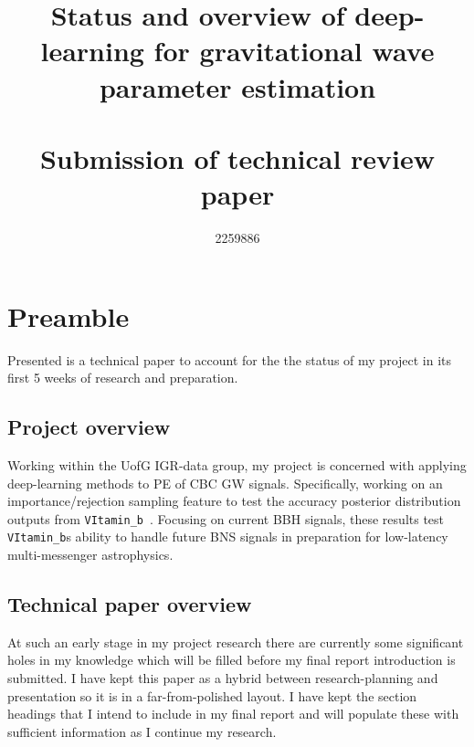 \documentclass[11pt]{article}
\title{\bf{Status and overview of deep-learning for gravitational wave parameter estimation}\\~\\
\large Submission of technical review paper}
\author{2259886}
\begin{document}
\maketitle








\tableofcontents

\break
\section{Preamble}

Presented is a technical paper to account for the the status of my project in its first 5 weeks of research and preparation.

\subsection{Project overview}

Working within the UofG IGR-data group, my project is concerned with applying deep-learning methods to \ac{PE} of \ac{CBC} \ac{GW} signals. Specifically, working on an importance/rejection sampling feature to test the accuracy posterior distribution outputs from \texttt{VItamin\_b}~\cite{vitpaper}. Focusing on current \ac{BBH} signals, these results test \texttt{VItamin\_b}\textquotesingle s ability to handle future \ac{BNS} signals in preparation for low-latency multi-messenger astrophysics.

\subsection{Technical paper overview}

At such an early stage in my project research there are currently some significant holes in my knowledge which will be filled before my final report introduction is submitted. I have kept this paper as a hybrid between research-planning and presentation so it is in a far-from-polished layout. I have kept the section headings that I intend to include in my final report and will populate these with sufficient information as I continue my research.
\vspace{0.3cm}
\end{document}
